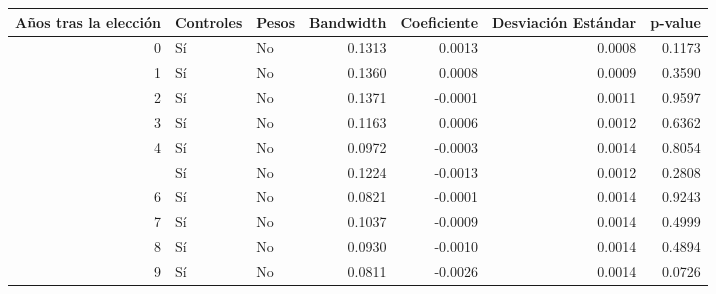 
\begin{tabular}{rllrrrr}
\toprule
Años tras la elección & Controles & Pesos & Bandwidth & Coeficiente & Desviación Estándar & p-value\\
\midrule
0 & Sí & No & 0.1313 & 0.0013 & 0.0008 & 0.1173\\
1 & Sí & No & 0.1360 & 0.0008 & 0.0009 & 0.3590\\
2 & Sí & No & 0.1371 & -0.0001 & 0.0011 & 0.9597\\
3 & Sí & No & 0.1163 & 0.0006 & 0.0012 & 0.6362\\
4 & Sí & No & 0.0972 & -0.0003 & 0.0014 & 0.8054\\
\addlinespace
5 & Sí & No & 0.1224 & -0.0013 & 0.0012 & 0.2808\\
6 & Sí & No & 0.0821 & -0.0001 & 0.0014 & 0.9243\\
7 & Sí & No & 0.1037 & -0.0009 & 0.0014 & 0.4999\\
8 & Sí & No & 0.0930 & -0.0010 & 0.0014 & 0.4894\\
9 & Sí & No & 0.0811 & -0.0026 & 0.0014 & 0.0726\\
\bottomrule
\end{tabular}